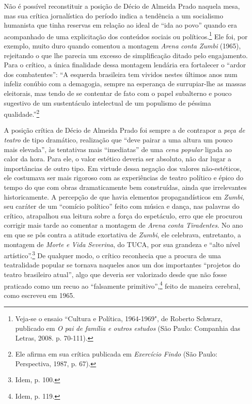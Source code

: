Não é possível reconstituir a posição de Décio de Almeida Prado naquela
mesa, mas sua crítica jornalística do período indica a tendência a um
socialismo humanista que tinha reservas em relação ao ideal de “ida ao
povo” quando era acompanhado de uma explicitação dos conteúdos sociais
ou políticos.\footnote{Veja-se o ensaio “Cultura e Política, 1964-1969",
  de Roberto Schwarz, publicado em \textit{O pai de família e outros
  estudos} (São Paulo: Companhia das Letras, 2008. p. 70-111).} Ele foi,
por exemplo, muito duro quando comentou a montagem \textit{Arena conta
Zumbi} (1965), rejeitando o que lhe parecia um excesso de simplificação
ditado pelo engajamento. Para o crítico, a única finalidade dessa
montagem lendária era fortalecer o “ardor dos combatentes”: “A esquerda
brasileira tem vividos nestes últimos anos num infeliz conúbio com a
demagogia, sempre na esperança de surrupiar-lhe as massas eleitorais,
mas tendo de se contentar de fato com o papel subalterno e pouco
sugestivo de um sustentáculo intelectual de um populismo de péssima
qualidade.”\footnote{Ele afirma em sua crítica publicada em
  \textit{Exercício Findo} (São Paulo: Perspectiva, 1987, p. 67).}

A posição crítica de Décio de Almeida Prado foi sempre a de contrapor a
\textit{peça de teatro} de tipo dramático, realização que “deve pairar a
uma altura um pouco mais elevada”, às tentativas mais “imediatas” de uma
\textit{cena popular} ligada ao calor da hora. Para ele, o valor estético
deveria ser absoluto, não dar lugar a importâncias de outro tipo. Em
virtude dessa negação dos valores não-estéticos, ele costumava ser mais
rigoroso com as experiências de teatro político e épico do tempo do que
com obras dramaticamente bem construídas, ainda que irrelevantes
historicamente. A percepção de que havia elementos propagandísticos em
\textit{Zumbi}, seu caráter de um “comício político” feito com música e
dança, nas palavras do crítico, atrapalhou sua leitura sobre a força do
espetáculo, erro que ele procurou corrigir mais tarde ao comentar a
montagem de \textit{Arena conta Tiradentes}. No ano em que se pôs contra a
atitude exortativa de \textit{Zumbi}, ele celebrava, entretanto, a montagem
de \textit{Morte e Vida Severina}, do TUCA, por sua grandeza e “alto nível
artístico”.\footnote{Idem, p. 100.} De qualquer modo, o crítico
reconhecia que a procura de uma teatralidade popular se tornava naqueles
anos um dos importantes “projetos do teatro brasileiro atual”, algo que
deveria ser valorizado desde que não fosse praticado como um recuo ao
“falsamente primitivo”,\footnote{Idem, p. 119.} feito de maneira
cerebral, como escreveu em 1965.

